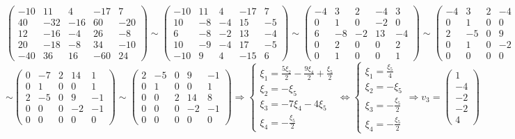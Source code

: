 \documentclass{article}
\begin{document}
$$\begin{pmatrix}
-10 & 11 & 4 & -17 & 7 \\
40 & -32 & -16 & 60 & -20 \\
12 & -16 & -4 & 26 & -8 \\
20 & -18 & -8 & 34 & -10 \\
-40 & 36 & 16 & -60 & 24
\end{pmatrix} \sim \begin{pmatrix}
-10 & 11 & 4 & -17 & 7 \\
10 & -8 & -4 & 15 & -5 \\
6 & -8 & -2 & 13 & -4 \\
10 & -9 & -4 & 17 & -5 \\
-10 & 9 & 4 & -15 & 6
\end{pmatrix} \sim \begin{pmatrix}
-4 & 3 & 2 & -4 & 3 \\
0 & 1 & 0 & -2 & 0 \\
6 & -8 & -2 & 13 & -4 \\
0 & 2 & 0 & 0 & 2 \\
0 & 1 & 0 & 0 & 1
\end{pmatrix} \sim \begin{pmatrix}
-4 & 3 & 2 & -4 & 3 \\
0 & 1 & 0 & 0 & 1 \\
2 & -5 & 0 & 9 & -1 \\
0 & 1 & 0 & -2 & 0 \\
0 & 0 & 0 & 0 & 0
\end{pmatrix} \sim$$
$$\sim \begin{pmatrix}
0 & -7 & 2 & 14 & 1 \\
0 & 1 & 0 & 0 & 1 \\
2 & -5 & 0 & 9 & -1 \\
0 & 0 & 0 & -2 & -1 \\
0 & 0 & 0 & 0 & 0
\end{pmatrix}\sim \begin{pmatrix}
2 & -5 & 0 & 9 & -1 \\
0 & 1 & 0 & 0 & 1 \\
0 & 0 & 2 & 14 & 8 \\
0 & 0 & 0 & -2 & -1 \\
0 & 0 & 0 & 0 & 0
\end{pmatrix} \Rightarrow \begin{cases}
\xi_1 = \frac{5\xi_2}{2} -\frac{9\xi_4}{2}+\frac{\xi_5}{2} \\
\xi_2 = -\xi_5 \\
\xi_3 = -7\xi_4-4\xi_5 \\
\xi_4 = -\frac{\xi_5}{2}
\end{cases} \Leftrightarrow \begin{cases}
\xi_1 = \frac{\xi_5}{4} \\
\xi_2 = -\xi_5 \\
\xi_3 = -\frac{\xi_5}{2} \\
\xi_4 = -\frac{\xi_5}{2}
\end{cases} \Rightarrow v_3 = \begin{pmatrix}1 \\ -4 \\ -2 \\ -2 \\ 4\end{pmatrix}$$ 
\end{document}
